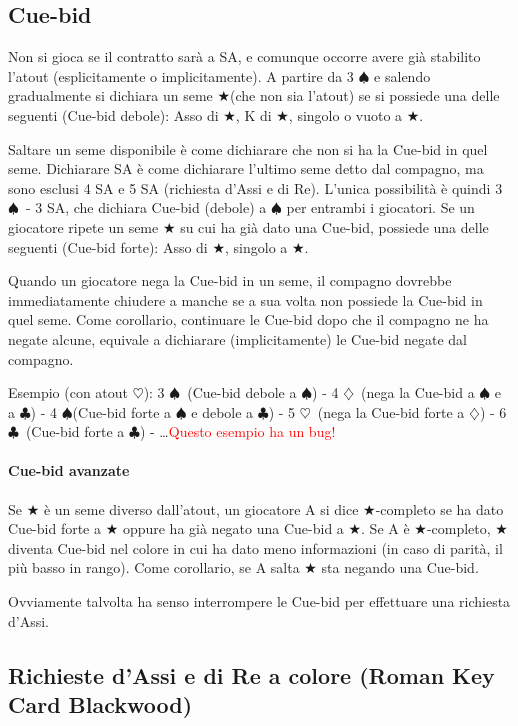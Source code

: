 \documentclass[a4paper,10pt]{article}
\renewcommand{\c}{$\clubsuit$\xspace}
\renewcommand{\d}{$\diamondsuit$\xspace}
\newcommand{\h}{$\heartsuit$\xspace}
\newcommand{\s}{$\spadesuit$\xspace}
\renewcommand{\j}{$\bigstar$\xspace}
\newcommand{\note}[1]{\textcolor{red}{#1}}
\begin{document}
\subsection{Cue-bid}

Non si gioca se il contratto sarà a SA, e comunque occorre avere già stabilito l'atout (esplicitamente o implicitamente). A partire da 3 \s e salendo gradualmente si dichiara un seme \j (che non sia l'atout) se si possiede una delle seguenti (Cue-bid debole): Asso di \j, K di \j, singolo o vuoto a \j.

Saltare un seme disponibile è come dichiarare che non si ha la Cue-bid in quel seme. Dichiarare SA è come dichiarare l'ultimo seme detto dal compagno, ma sono esclusi 4 SA e 5 SA (richiesta d'Assi e di Re). L'unica possibilità è quindi 3 \s\ - 3 SA, che dichiara Cue-bid (debole) a \s per entrambi i giocatori. Se un giocatore ripete un seme \j su cui ha già dato una Cue-bid, possiede una delle seguenti (Cue-bid forte): Asso di \j, singolo a \j.

Quando un giocatore nega la Cue-bid in un seme, il compagno dovrebbe immediatamente chiudere a manche se a sua volta non possiede la Cue-bid in quel seme.
Come corollario, continuare le Cue-bid dopo che il compagno ne ha negate alcune, equivale a dichiarare (implicitamente) le Cue-bid negate dal compagno.

Esempio (con atout \h): 3 \s\  (Cue-bid debole a \s) - 4 \d\ (nega la Cue-bid a \s e a \c) - 4 \s (Cue-bid forte a \s e debole a \c) - 5 \h\ (nega la Cue-bid forte a \d) - 6 \c\ (Cue-bid forte a \c) - \dots \note{Questo esempio ha un bug!}

\paragraph{Cue-bid avanzate} Se \j è un seme diverso dall'atout, un giocatore A si dice \j-completo se ha dato Cue-bid forte a \j oppure ha già negato una Cue-bid a \j. Se A è \j-completo, \j diventa Cue-bid nel colore in cui ha dato meno informazioni (in caso di parità, il più basso in rango). Come corollario, se A salta \j sta negando una Cue-bid.
\vspace{4mm}

Ovviamente talvolta ha senso interrompere le Cue-bid per effettuare una richiesta d'Assi.


\subsection{Richieste d'Assi e di Re a colore (Roman Key Card Blackwood)}
\end{document}
